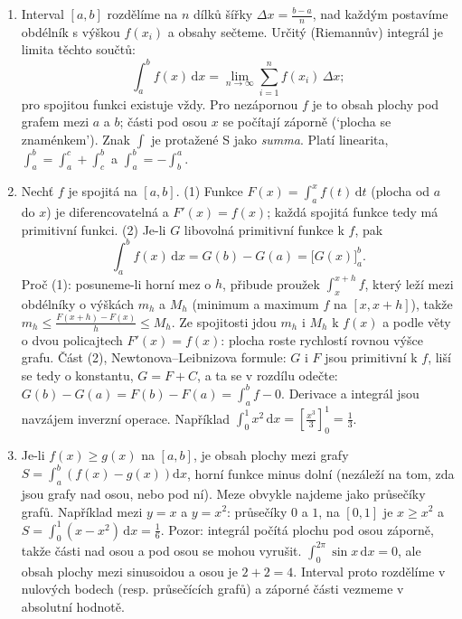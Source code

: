 \begin{enumerate}[label=\textbf{\arabic*.}, leftmargin=*, itemsep=0.8em]
  \item {}
  Interval $[a, b]$ rozdělíme na $n$ dílků šířky $\Delta x = \frac{b - a}{n}$, nad každým postavíme obdélník s výškou $f(x_i)$ a obsahy sečteme. Určitý (Riemannův) integrál je limita těchto součtů:
  \begin{equation*}
    \int_a^b f(x)\,\mathrm{d}x = \lim_{n\to\infty}\sum_{i=1}^{n}f(x_i)\,\Delta x;
  \end{equation*}
  pro spojitou funkci existuje vždy. Pro nezápornou $f$ je to obsah plochy pod grafem mezi $a$ a $b$; části pod osou $x$ se počítají záporně (`plocha se znaménkem'). Znak $\int$ je protažené S jako \textit{summa}. Platí linearita, $\int_a^b = \int_a^c + \int_c^b$ a $\int_a^b = -\int_b^a$. 

  \item {}
  Nechť $f$ je spojitá na $[a, b]$. (1) Funkce $F(x) = \int_a^x f(t)\,\mathrm{d}t$ (plocha od $a$ do $x$) je diferencovatelná a $F'(x) = f(x)$; každá spojitá funkce tedy má primitivní funkci. (2) Je-li $G$ libovolná primitivní funkce k $f$, pak
  \begin{equation*}
    \int_a^b f(x)\,\mathrm{d}x = G(b) - G(a) = {\big[G(x)\big]}_a^b.
  \end{equation*}
  Proč (1): posuneme-li horní mez o $h$, přibude proužek $\int_x^{x+h} f$, který leží mezi obdélníky o výškách $m_h$ a $M_h$ (minimum a maximum $f$ na $[x, x + h]$), takže $m_h\leq\frac{F(x + h) - F(x)}{h}\leq M_h$. Ze spojitosti jdou $m_h$ i $M_h$ k $f(x)$ a podle věty o dvou policajtech $F'(x) = f(x)$: plocha roste rychlostí rovnou výšce grafu. Část (2), Newtonova--Leibnizova formule: $G$ i $F$ jsou primitivní k $f$, liší se tedy o konstantu, $G = F + C$, a ta se v rozdílu odečte: $G(b) - G(a) = F(b) - F(a) = \int_a^b f - 0$. Derivace a integrál jsou navzájem inverzní operace. Například $\int_0^1 x^2\,\mathrm{d}x = \left[\frac{x^3}{3}\right]_0^1 = \frac{1}{3}$. 

  \item {}
  Je-li $f(x)\geq g(x)$ na $[a, b]$, je obsah plochy mezi grafy $S = \int_a^b\left(f(x) - g(x)\right)\mathrm{d}x$, horní funkce minus dolní (nezáleží na tom, zda jsou grafy nad osou, nebo pod ní). Meze obvykle najdeme jako průsečíky grafů. Například mezi $y = x$ a $y = x^2$: průsečíky $0$ a $1$, na $[0, 1]$ je $x\geq x^2$ a $S = \int_0^1(x - x^2)\,\mathrm{d}x = \frac{1}{6}$. Pozor: integrál počítá plochu pod osou záporně, takže části nad osou a pod osou se mohou vyrušit. $\int_0^{2\pi}\sin x\,\mathrm{d}x = 0$, ale obsah plochy mezi sinusoidou a osou je $2 + 2 = 4$. Interval proto rozdělíme v nulových bodech (resp. průsečících grafů) a záporné části vezmeme v absolutní hodnotě. 


\end{enumerate}

